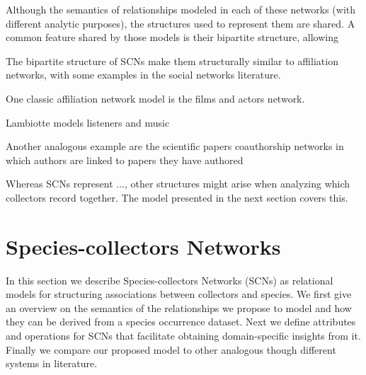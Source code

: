 
Although the semantics of relationships modeled in each of these networks (with different analytic purposes), the structures used to represent them are shared. A common feature shared by those models is their bipartite structure, allowing  

The bipartite structure of SCNs make them structurally similar to affiliation networks, with some examples in the social networks literature.

One classic affiliation network model is the films and actors network.

Lambiotte models listeners and music

Another analogous example are the scientific papers coauthorship networks in which authors are linked to papers they have authored \cite{Newman2004}



Whereas SCNs represent ..., other structures might arise when analyzing which collectors record together. 
The model presented in the next section covers this.




\section{Species-collectors Networks}

In this section we describe Species-collectors Networks (SCNs) as relational models for structuring associations between collectors and species.
We first give an overview on the semantics of the relationships we propose to model and how they can be derived from a species occurrence dataset.
Next we define attributes and operations for SCNs that facilitate obtaining domain-specific insights from it.
Finally we compare our proposed model to other analogous though different systems in literature.

